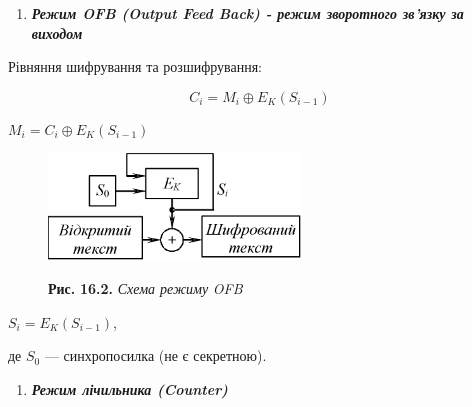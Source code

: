 \bigskip


\bigskip


\bigskip


\bigskip


\bigskip


\bigskip


\bigskip

\liststyleWWviiiNumxxi
\setcounter{saveenum}{\value{enumi}}
\begin{enumerate}
\setcounter{enumi}{\value{saveenum}}
\item {\centering\bfseries\itshape
Режим OFB (Output Feed Back) - режим зворотного зв’язку за виходом
\par}
\end{enumerate}

\bigskip


\bigskip

Рівняння шифрування та розшифрування:

\begin{equation*}
{C_{{i}}=M_{{i}}{\oplus}E_{{K}}(S_{{i-1}})}
\end{equation*}
{\centering  ${M_{{i}}=C_{{i}}{\oplus}E_{{K}}(S_{{i-1}})}$\par}

\begin{figure}
\centering
\begin{minipage}{2.7689in}
 \includegraphics[width=2.6425in,height=1.1146in]{crypt-img/crypt-img338.png} 

{\centering
\textbf{Рис. }\textbf{16}\textbf{.2.} \textit{Схема режим}\textit{у}\textit{
}\textit{OFB}
\par}
\end{minipage}
\end{figure}
{\centering
 ${S_{{i}}=E_{{K}}(S_{{i-1}})}$,
\par}

де  ${S_{{0}}}$ --- синхропосилка (не є секретною).


\bigskip


\bigskip

\liststyleWWviiiNumxxi
\setcounter{saveenum}{\value{enumi}}
\begin{enumerate}
\setcounter{enumi}{\value{saveenum}}
\item {\centering\bfseries\itshape
Режим лічильника (Counter)
\par}
\end{enumerate}
{\centering \par}

